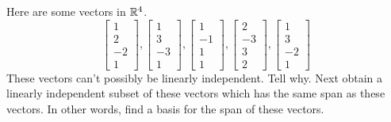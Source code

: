\documentclass{ximera}
\begin{document}
\begin{problem}\label{prb:3.28} Here are some vectors in $\mathbb{R}^{4}$.
\begin{equation*}
\left[
\begin{array}{r}
1 \\
2 \\
-2 \\
1
\end{array}
\right] ,\left[
\begin{array}{r}
1 \\
3 \\
-3 \\
1
\end{array}
\right] ,\left[
\begin{array}{r}
1 \\
-1 \\
1 \\
1
\end{array}
\right] ,\left[
\begin{array}{r}
2 \\
-3 \\
3 \\
2
\end{array}
\right] ,\left[
\begin{array}{r}
1 \\
3 \\
-2 \\
1
\end{array}
\right]
\end{equation*}
These vectors can't possibly be linearly independent. Tell why. Next obtain a
linearly independent subset of these vectors which has the same span as
these vectors. In other words, find a basis for the span of these vectors.
\end{problem}
\end{document}
